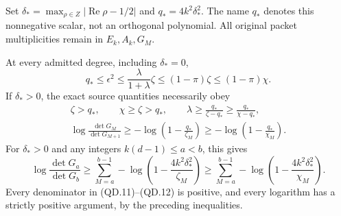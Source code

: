 Set \(\delta_* =\max_{\rho\in Z}|\operatorname{Re}\rho-1/2|\)
and \(q_*=4k^2\delta_*^2\).  The name \(q_*\) denotes
this nonnegative scalar, not an orthogonal polynomial.  All
original packet multiplicities remain in \(E_k,A_k,G_M\).

\begin{theorem}
At every admitted degree, including \(\delta_*=0\),
\[
 \boxed{q_*\leq\epsilon^2
       \leq\frac{\lambda}{1+\lambda}\zeta
       \leq(1-\pi)\zeta
       \leq(1-\pi)\chi.}                                \tag{QD.10}
\]
If \(\delta_*>0\), the exact source quantities necessarily obey
\[
 \begin{gathered}
 \zeta>q_*,\qquad \chi\geq\zeta>q_*,\qquad
 \lambda\geq\frac{q_*}{\zeta-q_*}
                \geq\frac{q_*}{\chi-q_*},\\
 \boxed{\log\frac{\det G_M}{\det G_{M+1}}
       \geq-\log\left(1-\frac{q_*}{\zeta_M}\right)
       \geq-\log\left(1-\frac{q_*}{\chi_M}\right).}
 \end{gathered}                                                   \tag{QD.11}
\]
For \(\delta_*>0\) and any integers \(k(d-1)\leq a<b\), this gives
\[
 \boxed{\log\frac{\det G_a}{\det G_b}
   \geq\sum_{M=a}^{b-1}-\log\left(1-
                                 \frac{4k^2\delta_*^2}{\zeta_M}\right)
   \geq\sum_{M=a}^{b-1}-\log\left(1-
                                 \frac{4k^2\delta_*^2}{\chi_M}\right).}
                                                                    \tag{QD.12}
\]
Every denominator in (QD.11)--(QD.12) is positive, and every
logarithm has a strictly positive argument, by the preceding inequalities.
\end{theorem}

